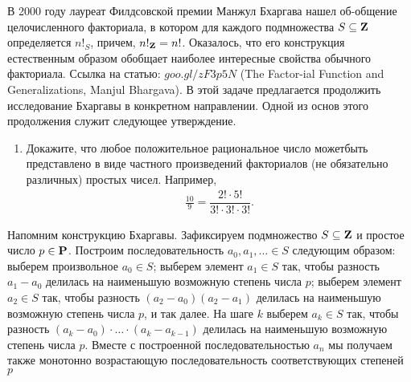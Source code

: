 ﻿

В 2000 году лауреат Филдсовской премии Манжул Бхаргава нашел об-\linebreak общение целочисленного факториала, в котором для каждого подмножества $S\subseteq \text{\bfseries Z}$ определяется $n!_S$, причем, $n!_\text{\bfseries Z} = n!$. Оказалось, что его конструкция естественным образом обобщает наиболее интересные свойства обычного факториала. Ссылка на статью: \href{https://goo.gl/zF3p5N}{$goo.gl/zF3p5N$} (The Factor-\linebreak ial Function and Generalizations, Manjul Bhargava). В этой задаче предлагается продолжить исследование Бхаргавы в конкретном направлении. Одной из основ этого продолжения служит следующее утверждение.

\begin{enumerate}
\item Докажите, что любое положительное рациональное число может\linebreak  быть представлено в виде частного произведений факториалов (не обязательно различных) простых чисел. Например, 
\begin{align*}
\frac{10}{9} = \dfrac{2! \cdot 5!}{3! \cdot 3! \cdot 3!}.
\end{align*}
\end{enumerate}

Напомним конструкцию Бхаргавы. Зафиксируем подмножество $S \subseteq \text{\bfseries Z}$ и простое число $p \in \text{\bfseries P}$. Построим последовательность $a_0, a_1, \ldots \in S$ следующим образом: выберем произвольное $a_0 \in S$;  выберем элемент $a_1 \in S$ так, чтобы разность $a_1 - a_0$ делилась на наименьшую возможную степень числа $p$;  выберем элемент $a_2 \in S$ так, чтобы разность $(a_2 - a_0)(a_2 - a_1)$ делилась на наименьшую возможную степень числа $p$, и так далее. На шаге $k$ выберем $a_k \in S$ так, чтобы разность $(a_k - a_0)\cdot \ldots \cdot (a_k - a_{k-1})$ делилась на наименьшую возможную степень числа $p$. Вместе с построенной последовательностью $a_n$ мы получаем также монотонно возрастающую последовательность соответствующих степеней $p$

